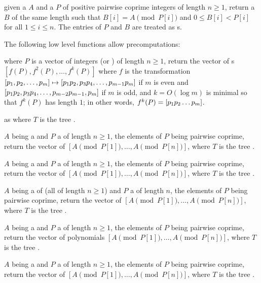  given a  $A$ and a 
$P$ of positive pairwise coprime integers of length $n\ge 1$, return a
 $B$ of the same length such that $B[i]=A\pmod{P[i]}$ and
$0\leq B[i] < P[i]$ for all $1\leq i\leq n$. The entries of $P$ and $B$ are
treated as s.

The following low level functions allow precomputations:

 where $P$ is a vector of integers (or
) of length $n\ge 1$, return the vector of s
$[f(P),f^2(P),\ldots,f^k(P)]$ where $f$ is the transformation
$[p_1,p_2,\ldots,p_m] \mapsto [p_1\*p_2,p_3\*p_4,\ldots,p_{m-1}\*p_m]$ if $m$
is even and $[p_1\*p_2,p_3\*p_4,\ldots,p_{m-2}\*p_{m-1},p_m]$ if $m$ is odd,
and $k = O(\log m)$ is minimal so that $f^k(P)$ has length $1$; in other
words, $f^k(P) = [p_1\*p_2\*\ldots\*p_m]$.

as  where $T$ is the tree .

 $A$ being a 
and $P$ a  of length $n\ge 1$, the elements of $P$ being
pairwise coprime, return the vector of 
$[A \pmod{P[1]},\ldots,A \pmod{P[n]}]$,
where $T$ is the tree .

 $A$ being a 
and $P$ a  of length $n\ge 1$, the elements of $P$ being
pairwise coprime, return the vector of 
$[A \pmod{P[1]},\ldots,A \pmod{P[n]}]$,
where $T$ is the tree .

 $A$ being a 
of  (all of length $n\ge 1$) and $P$ a  of length $n$,
the elements of $P$ being pairwise coprime, return the vector of 
$[A \pmod{P[1]},\ldots,A \pmod{P[n]}]$,
where $T$ is the tree .

 $A$ being a 
and $P$ a  of length $n\ge 1$, the elements of $P$ being
pairwise coprime, return the vector of  polynomials
$[A \pmod{P[1]},\ldots,A \pmod{P[n]}]$,
where $T$ is the tree .

 $A$ being a 
and $P$ a  of length $n\ge 1$, the elements of $P$ being
pairwise coprime, return the vector of 
$[A \pmod{P[1]},\ldots,A \pmod{P[n]}]$,
where $T$ is the tree .

